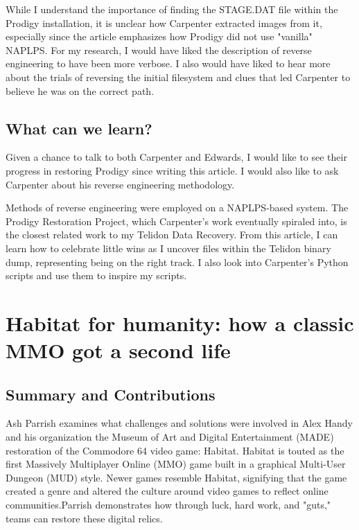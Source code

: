 \documentclass[sigconf]{acmart}
\begin{document}
While I understand the importance of finding the STAGE.DAT file within the Prodigy installation, it is unclear how Carpenter extracted images from it, especially since the article emphasizes how Prodigy did not use "vanilla" NAPLPS. For my research, I would have liked the description of reverse engineering to have been more verbose. I also would have liked to hear more about the trials of reversing the initial filesystem and clues that led Carpenter to believe he was on the correct path. 

\subsection{What can we learn?}

Given a chance to talk to both Carpenter and Edwards, I would like to see their progress in restoring Prodigy since writing this article. I would also like to ask Carpenter about his reverse engineering methodology.

Methods of reverse engineering were employed on a NAPLPS-based system. The Prodigy Restoration Project, which Carpenter's work eventually spiraled into, is the closest related work to my Telidon Data Recovery. From this article, I can learn how to celebrate little wins as I uncover files within the Telidon binary dump, representing being on the right track. I also look into Carpenter's Python scripts and use them to inspire my scripts.

\section{Habitat for humanity: how a classic MMO got a second life}


\subsection{Summary and Contributions}

Ash Parrish examines what challenges and solutions were involved in Alex Handy and his organization the Museum of Art and Digital Entertainment (MADE) restoration of the Commodore 64 video game: Habitat. Habitat is touted as the first Massively Multiplayer Online (MMO) game built in a graphical Multi-User Dungeon (MUD) style. Newer games resemble Habitat, signifying that the game created a genre and altered the culture around video games to reflect online communities.Parrish demonstrates how through luck, hard work, and "guts," teams can restore these digital relics.
\end{document}
